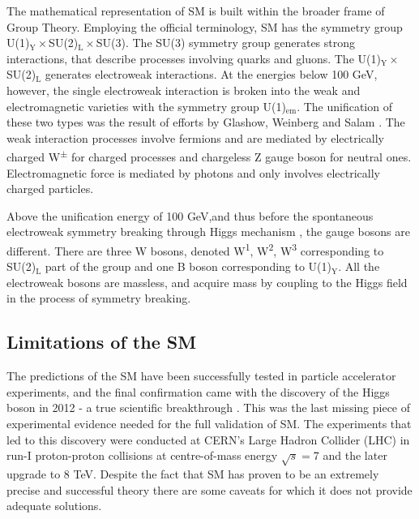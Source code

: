The mathematical representation of SM is built within the broader frame of Group Theory. Employing the official terminology, SM has the symmetry group U(1)$_{\text{Y}}\times$SU(2)$_{\text{L}}\times$SU(3). The SU(3) symmetry group generates strong interactions, that describe processes involving quarks and gluons. The U(1)$_{\text{Y}}\times$SU(2)$_{\text{L}}$ generates electroweak interactions. At the energies below 100 GeV, however, the single electroweak interaction is broken into the weak and electromagnetic varieties with the symmetry group U(1)$_{\text{em}}$. 
The unification of these two types was the result of efforts by Glashow, Weinberg and Salam \citep{Glashow:1961tr,weinberg1967model,salam1968elementary}. 
The weak interaction processes involve fermions and are mediated by electrically charged W\textsuperscript{$\pm$} for charged processes and chargeless Z gauge boson for neutral ones. Electromagnetic force is mediated by photons and only involves electrically charged particles. 

Above the unification energy of 100 GeV,and thus before the spontaneous electroweak symmetry breaking  through Higgs mechanism \citep{englert1964broken, higgs1964broken}, the gauge bosons are different. There are three W bosons, denoted W\textsuperscript{1}, W\textsuperscript{2}, W\textsuperscript{3} corresponding to SU(2)$_{\text{L}}$ part of the group and one B boson corresponding to U(1)$_{\text{Y}}$. 
All the electroweak bosons are massless, and acquire mass by coupling to the Higgs field in the process of symmetry breaking.  

\subsection{Limitations of the SM}

The predictions of the SM have been successfully tested in particle accelerator experiments, and the final confirmation came with the discovery of the Higgs boson in 2012 - a true scientific breakthrough \citep{Aad:2012tfa}\citep{chatrchyan2012observation}. This was the last missing piece of experimental evidence needed for the full validation of SM. The experiments that led to this discovery were conducted at CERN’s Large Hadron Collider (LHC) in run-I proton-proton collisions at centre-of-mass energy $\sqrt{s}=$7 and the later upgrade to 8 TeV.  
Despite the fact that SM has proven to be an extremely precise and successful theory there are some caveats for which it does not provide  adequate solutions. 

